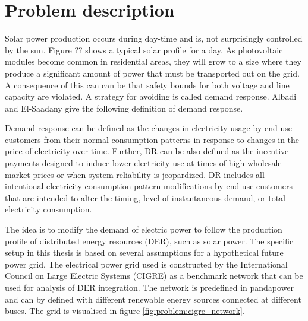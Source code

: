 \documentclass[class=book, crop=false]{standalone}
\begin{document}
\section{Problem description}
Solar power production occurs during day-time and is, not surprisingly controlled by the sun. Figure ?? shows a typical solar profile for a day. As photovoltaic modules become common in residential areas, they will grow to a size where they produce a significant amount of power that must be transported out on the grid. A consequence of this can can be that safety bounds for both voltage and line capacity are violated. A strategy for avoiding is called demand response. Albadi and El-Saadany give the following definition of demand response.\cite{demand_response_definition}

\begin{displayquote}
Demand response can be defined as the changes in electricity usage by end-use customers from their normal consumption patterns in response to changes in the price of electricity over time. Further, DR can be also defined as the incentive payments designed to induce lower electricity use at times of high wholesale market prices or when system reliability is jeopardized. DR includes all intentional electricity consumption pattern modifications by end-use customers that are intended to alter the timing, level of
instantaneous demand, or total electricity consumption.
\end{displayquote}


The idea is to modify the demand of electric power to follow the production profile of distributed energy resources (DER), such as solar power. The specific setup in this thesis is based on several assumptions for a hypothetical future power grid. The electrical power grid used is constructed by the International Council on Large Electric Systems (CIGRE) as a benchmark network that can be used for analysis of DER integration\cite{cigre}. The network is predefined in pandapower and can by defined with different renewable energy sources connected at different buses. The grid is visualised in figure \ref{fig:problem:cigre_network}. 
\end{document}
